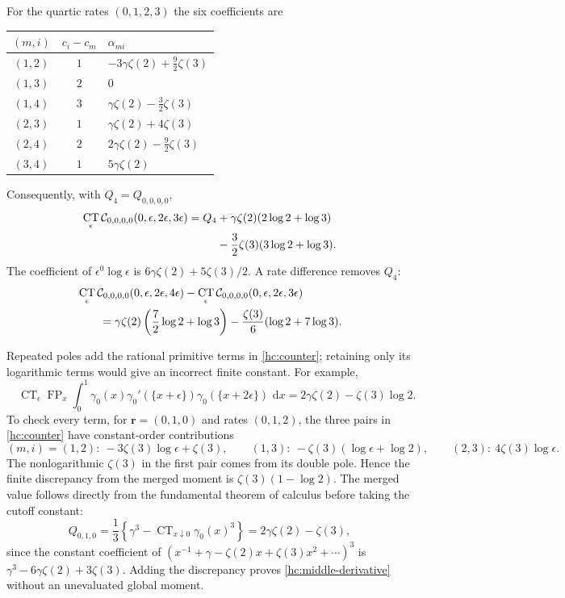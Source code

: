 \documentclass[11pt,a4paper]{article}
\numberwithin{equation}{section}
\theoremstyle{definition}
\theoremstyle{remark}
\DeclareMathOperator{\FP}{FP}
\DeclareMathOperator{\CT}{CT}
\newcommand{\dd}{\,\mathrm d}
\begin{document}
For the quartic rates $(0,1,2,3)$ the six coefficients are
\begin{center}
\begin{tabular}{ccl}
\hline
$(m,i)$ & $c_i-c_m$ & $\alpha_{mi}$\\
\hline
$(1,2)$ & $1$ & $-3\gamma\zeta(2)+\tfrac92\zeta(3)$\\
$(1,3)$ & $2$ & $0$\\
$(1,4)$ & $3$ & $\gamma\zeta(2)-\tfrac32\zeta(3)$\\
$(2,3)$ & $1$ & $\gamma\zeta(2)+4\zeta(3)$\\
$(2,4)$ & $2$ & $2\gamma\zeta(2)-\tfrac92\zeta(3)$\\
$(3,4)$ & $1$ & $5\gamma\zeta(2)$\\
\hline
\end{tabular}
\end{center}
Consequently, with $Q_4=Q_{0,0,0,0}$,
\begin{align}
 \CT_{\epsilon}\mathcal C_{0,0,0,0}(0,\epsilon,2\epsilon,3\epsilon)
 =Q_4
 &+\gamma\zeta(2)(2\log2+\log3)\notag\\
 &-\frac32\zeta(3)(3\log2+\log3).
 \label{hc:quartic}
\end{align}
The coefficient of $\epsilon^0\log\epsilon$ is
$6\gamma\zeta(2)+5\zeta(3)/2$. A rate difference removes $Q_4$:
\begin{align}
 &\CT_{\epsilon}\mathcal C_{0,0,0,0}(0,\epsilon,2\epsilon,4\epsilon)
 -\CT_{\epsilon}\mathcal C_{0,0,0,0}(0,\epsilon,2\epsilon,3\epsilon)
 \notag\\
 &\qquad=\gamma\zeta(2)\left(\frac72\log2+\log3\right)
       -\frac{\zeta(3)}6(\log2+7\log3).
 \label{hc:quartic-difference}
\end{align}

Repeated poles add the rational primitive terms in
\eqref{hc:counter}; retaining only its logarithmic terms would give
an incorrect finite constant. For example,
\begin{equation}\label{hc:middle-derivative}
 \boxed{\quad
 \CT_{\epsilon}\FP_x\int_0^1
   \gamma_0(x)\gamma_0'(\{x+\epsilon\})
                         \gamma_0(\{x+2\epsilon\})\,\dd x
 =2\gamma\zeta(2)-\zeta(3)\log2.
 \quad}
\end{equation}
To check every term, for $\boldsymbol r=(0,1,0)$ and rates $(0,1,2)$,
the three pairs in \eqref{hc:counter} have constant-order contributions
\[
 (m,i)=(1,2):\ -3\zeta(3)\log\epsilon+\zeta(3),\qquad
 (1,3):\ -\zeta(3)(\log\epsilon+\log2),\qquad
 (2,3):\ 4\zeta(3)\log\epsilon.
\]
The nonlogarithmic $\zeta(3)$ in the first pair comes from its double
pole. Hence the finite discrepancy from the merged moment is
$\zeta(3)(1-\log2)$. The merged value follows directly from the
fundamental theorem of calculus before taking the cutoff constant:
\[
 Q_{0,1,0}=\frac13\left\{\gamma^3-
                 \CT_{x\downarrow0}\gamma_0(x)^3\right\}
          =2\gamma\zeta(2)-\zeta(3),
\]
since the constant coefficient of
$(x^{-1}+\gamma-\zeta(2)x+\zeta(3)x^2+\cdots)^3$ is
$\gamma^3-6\gamma\zeta(2)+3\zeta(3)$. Adding the discrepancy proves
\eqref{hc:middle-derivative} without an unevaluated global moment.
\end{document}
